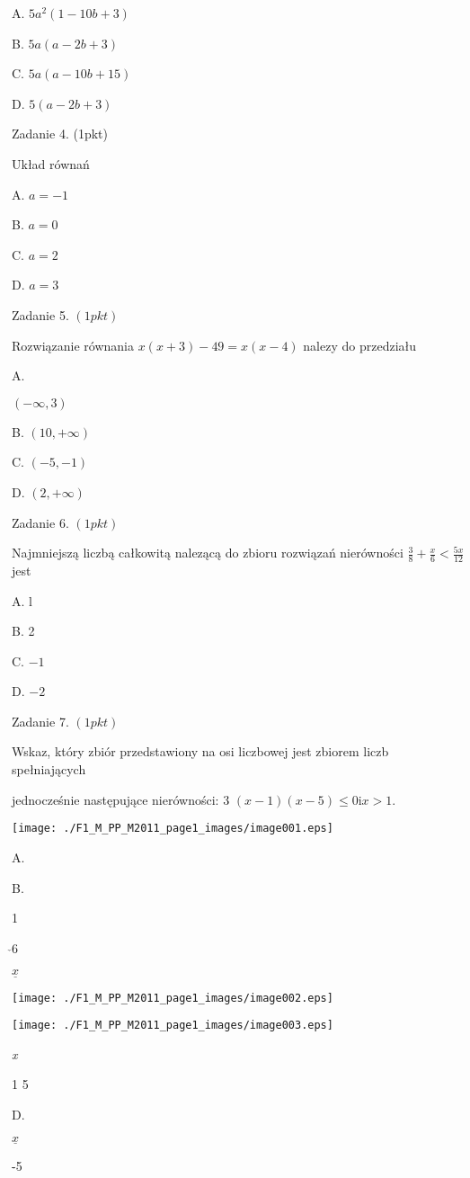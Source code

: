 \documentclass[a4paper,12pt]{article}
\begin{document}
A. $5a^{2}(1-10b+3)$

B. $5a(a-2b+3)$

C. $5a(a-10b+15)$

D. $5(a-2b+3)$

Zadanie 4. (1pkt)

Układ równań 

A. $a=-1$

B. $a=0$

C. $a=2$

D. $a=3$

Zadanie 5. $(1pkt)$

Rozwiązanie równania $x(x+3)-49=x(x-4)$ nalezy do przedziału

A.

$(-\infty,3)$

B. $(10,+\infty)$

C. $(-5,-1)$

D. $(2,+\infty)$

Zadanie 6. $(1pkt)$

Najmniejszą liczbą całkowitą nalezącą do zbioru rozwiązań nierówności $\displaystyle \frac{3}{8}+\frac{x}{6}<\frac{5x}{12}$ jest

A. l

B. 2

C. $-1$

D. $-2$

Zadanie 7. $(1pkt)$

Wskaz, który zbiór przedstawiony na osi liczbowej jest zbiorem liczb spełniających

jednocześnie następujące nierówności: 3 $(x-1)(x-5)\leq 0 \mathrm{i} x>1.$
\begin{center}
\texttt{[image: ./F1\_M\_PP\_M2011\_page1\_images/image001.eps]}
\end{center}
A.

B.

1

$\check{}$6

$\underline{x}$
\begin{center}
\texttt{[image: ./F1\_M\_PP\_M2011\_page1\_images/image002.eps]}

\texttt{[image: ./F1\_M\_PP\_M2011\_page1\_images/image003.eps]}
\end{center}
{\it x}

1 5

D.

$\underline{x}$

-$\check{}$5
\end{document}
